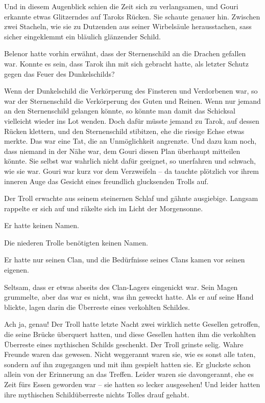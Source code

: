 Und in diesem Augenblick schien die Zeit sich zu verlangsamen, und Gouri erkannte etwas Glitzerndes auf Taroks Rücken. Sie schaute genauer hin. Zwischen zwei Stacheln, wie sie zu Dutzenden aus seiner Wirbelsäule herausstachen, sass sicher eingeklemmt ein bläulich glänzender Schild.

Belenor hatte vorhin erwähnt, dass der Sternenschild an die Drachen gefallen war. Konnte es sein, dass Tarok ihn mit sich gebracht hatte, als letzter Schutz gegen das Feuer des Dunkelschilds?

Wenn der Dunkelschild die Verkörperung des Finsteren und Verdorbenen war, so war der Sternenschild die Verkörperung des Guten und Reinen. Wenn nur jemand an den Sternenschild gelangen könnte, so könnte man damit das Schicksal vielleicht wieder ins Lot wenden. Doch dafür müsste jemand zu Tarok, auf dessen Rücken klettern, und den Sternenschild stibitzen, ehe die riesige Echse etwas merkte. Das war eine Tat, die an Unmöglichkeit angrenzte. Und dazu kam noch, dass niemand in der Nähe war, dem Gouri diesen Plan überhaupt mitteilen könnte. Sie selbst war wahrlich nicht dafür geeignet, so unerfahren und schwach, wie sie war. Gouri war kurz vor dem Verzweifeln – da tauchte plötzlich vor ihrem inneren Auge das Gesicht eines freundlich glucksenden Trolls auf.



\trennzeichen



Der Troll erwachte aus seinem steinernen Schlaf und gähnte ausgiebige. Langsam rappelte er sich auf und räkelte sich im Licht der Morgensonne.

Er hatte keinen Namen.

Die niederen Trolle benötigten keinen Namen.

Er hatte nur seinen Clan, und die Bedürfnisse seines Clans kamen vor seinen eigenen.

Seltsam, dass er etwas abseits des Clan-Lagers eingenickt war. Sein Magen grummelte, aber das war es nicht, was ihn geweckt hatte. Als er auf seine Hand blickte, lagen darin die Überreste eines verkohlten Schildes.

Ach ja, genau! Der Troll hatte letzte Nacht zwei wirklich nette Gesellen getroffen, die seine Brücke überquert hatten, und diese Gesellen hatten ihm die verkohlten Überreste eines mythischen Schilds geschenkt. Der Troll grinste selig. Wahre Freunde waren das gewesen. Nicht weggerannt waren sie, wie es sonst alle taten, sondern auf ihn zugegangen und mit ihm gespielt hatten sie. Er gluckste schon allein von der Erinnerung an das Treffen. Leider waren sie davongerannt, ehe es Zeit fürs Essen geworden war – sie hatten so lecker ausgesehen! Und leider hatten ihre mythischen Schildüberreste nichts Tolles drauf gehabt.

